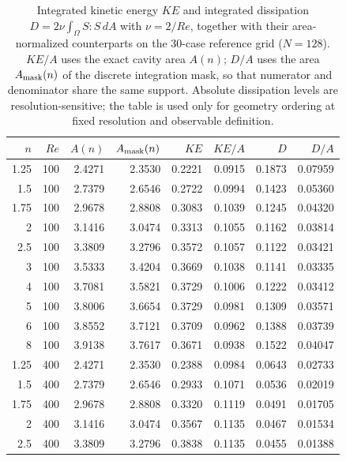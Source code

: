\documentclass[11pt]{article}
\begin{document}
\begin{table}[H]
\centering
\caption{Integrated kinetic energy $KE$ and integrated dissipation
$D=2\nu\int_{\Omega}S:S\,dA$ with $\nu=2/Re$, together with their
area-normalized counterparts on the 30-case reference grid ($N=128$).
$KE/A$ uses the exact cavity area $A(n)$; $D/A$ uses the area $A_{\rm mask}(n)$
of the discrete integration mask, so that numerator and denominator share the
same support. Absolute dissipation levels are resolution-sensitive; the table
is used only for geometry ordering at fixed resolution and observable
definition.}




\label{tab:energy30}
\begin{tabular}{@{}rrrrrrrr@{}}
\toprule
$n$ & $Re$ & $A(n)$ & $A_{\rm mask}(n)$ & $KE$ & $KE/A$ & $D$ & $D/A$ \\
\midrule
 1.25 &  100 &  2.4271 &  2.3530 &  0.2221 &  0.0915 &  0.1873 &  0.07959 \\
  1.5 &  100 &  2.7379 &  2.6546 &  0.2722 &  0.0994 &  0.1423 &  0.05360 \\
 1.75 &  100 &  2.9678 &  2.8808 &  0.3083 &  0.1039 &  0.1245 &  0.04320 \\
    2 &  100 &  3.1416 &  3.0474 &  0.3313 &  0.1055 &  0.1162 &  0.03814 \\
  2.5 &  100 &  3.3809 &  3.2796 &  0.3572 &  0.1057 &  0.1122 &  0.03421 \\
    3 &  100 &  3.5333 &  3.4204 &  0.3669 &  0.1038 &  0.1141 &  0.03335 \\
    4 &  100 &  3.7081 &  3.5821 &  0.3729 &  0.1006 &  0.1222 &  0.03412 \\
    5 &  100 &  3.8006 &  3.6654 &  0.3729 &  0.0981 &  0.1309 &  0.03571 \\
    6 &  100 &  3.8552 &  3.7121 &  0.3709 &  0.0962 &  0.1388 &  0.03739 \\
    8 &  100 &  3.9138 &  3.7617 &  0.3671 &  0.0938 &  0.1522 &  0.04047 \\
 1.25 &  400 &  2.4271 &  2.3530 &  0.2388 &  0.0984 &  0.0643 &  0.02733 \\
  1.5 &  400 &  2.7379 &  2.6546 &  0.2933 &  0.1071 &  0.0536 &  0.02019 \\
 1.75 &  400 &  2.9678 &  2.8808 &  0.3320 &  0.1119 &  0.0491 &  0.01705 \\
    2 &  400 &  3.1416 &  3.0474 &  0.3567 &  0.1135 &  0.0467 &  0.01534 \\
  2.5 &  400 &  3.3809 &  3.2796 &  0.3838 &  0.1135 &  0.0455 &  0.01388 \\

\end{tabular}
\end{table}
\end{document}
